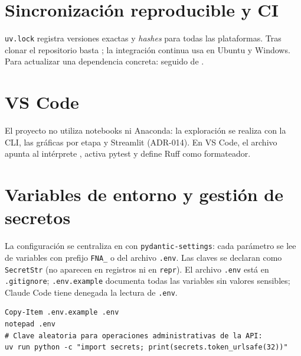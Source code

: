 \section{Sincronización reproducible y CI}
\texttt{uv.lock} registra versiones exactas y \emph{hashes} para todas las plataformas. Tras clonar el
repositorio basta ; la integración continua usa  en Ubuntu y Windows. Para
actualizar una dependencia concreta:  seguido de
.

\section{VS Code}
El proyecto no utiliza notebooks ni Anaconda: la exploración se realiza con la CLI, las gráficas por etapa y
Streamlit (ADR-014). En VS Code, el archivo
 apunta al intérprete , activa pytest y define Ruff
como formateador.

\section{Variables de entorno y gestión de secretos}
La configuración se centraliza en  con \texttt{pydantic-settings}:
cada parámetro se lee de variables con prefijo \texttt{FNA\_} o del archivo \texttt{.env}. Las claves se
declaran como \texttt{SecretStr} (no aparecen en registros ni en \texttt{repr}). El archivo \texttt{.env} está
en \texttt{.gitignore}; \texttt{.env.example} documenta todas las variables sin valores sensibles; Claude Code
tiene denegada la lectura de \texttt{.env}.
\begin{lstlisting}[style=ps]
Copy-Item .env.example .env
notepad .env
# Clave aleatoria para operaciones administrativas de la API:
uv run python -c "import secrets; print(secrets.token_urlsafe(32))"
\end{lstlisting}
